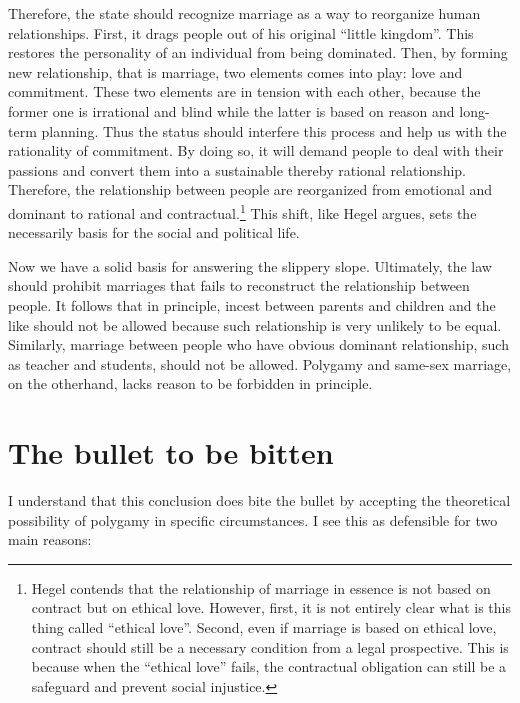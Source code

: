\documentclass[man,floatsintext]{apa7}
\begin{document}
Therefore, the state should recognize marriage as a way to reorganize human relationships. First, it drags people out of his original ``little kingdom''. This restores the personality of an individual from being dominated. Then, by forming new relationship, that is marriage, two elements comes into play: love and commitment. These two elements are in tension with each other, because the former one is irrational and blind while the latter is based on reason and long-term planning. Thus the status should interfere this process and help us with the rationality of commitment. By doing so, it will demand people to deal with their passions and convert them into a sustainable thereby rational relationship. Therefore, the relationship between people are reorganized from emotional and dominant to rational and contractual.\footnote{Hegel contends that the relationship of marriage in essence is not based on contract but on ethical love. However, first, it is not entirely clear what is this thing called ``ethical love''. Second, even if marriage is based on ethical love, contract should still be a necessary condition from a legal prospective. This is because when the ``ethical love'' fails, the contractual obligation can still be a safeguard and prevent social injustice.} This shift, like Hegel argues, sets the necessarily basis for the social and political life.

Now we have a solid basis for answering the slippery slope. Ultimately, the law should prohibit marriages that fails to reconstruct the relationship between people. It follows that in principle, incest between parents and children and the like should not be allowed because such relationship is very unlikely to be equal. Similarly, marriage between people who have obvious dominant relationship, such as teacher and students, should not be allowed. Polygamy and same-sex marriage, on the otherhand, lacks reason to be forbidden in principle. 

\section{The bullet to be bitten}

I understand that this conclusion does bite the bullet by accepting the theoretical possibility of polygamy in specific circumstances. I see this as defensible for two main reasons:
\end{document}
